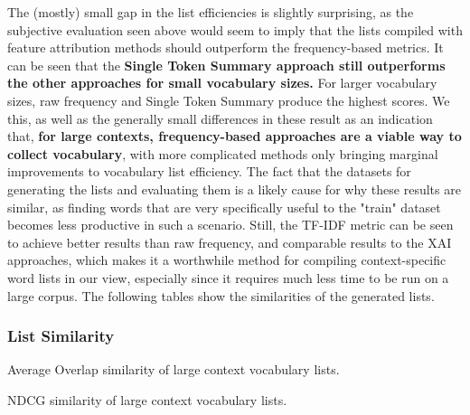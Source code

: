 The (mostly) small gap in the list efficiencies is slightly surprising, as the subjective evaluation seen above would seem to imply that the lists compiled with feature attribution methods should outperform the frequency-based metrics.
It can be seen that the \textbf{Single Token Summary approach still outperforms the other approaches for small vocabulary sizes.}
For larger vocabulary sizes, raw frequency and Single Token Summary produce the highest scores.
We this, as well as the generally small differences in these result as an indication that, \textbf{for large contexts, frequency-based approaches are a viable way to collect vocabulary}, with more complicated methods only bringing marginal improvements to vocabulary list efficiency.
The fact that the datasets for generating the lists and evaluating them is a likely cause for why these results are similar, as finding words that are very specifically useful to the "train" dataset becomes less productive in such a scenario.
Still, the TF-IDF metric can be seen to achieve better results than raw frequency, and comparable results to the XAI approaches, which makes it a worthwhile method for compiling context-specific word lists in our view, especially since it requires much less time to be run on a large corpus.
The following tables show the similarities of the generated lists.

\subsubsection{List Similarity}

\begin{table}[H]
	\centering
	\resizebox{\textwidth}{!}{%
		
	}
	\caption{Average Overlap similarity of large context vocabulary lists.}
	\label{tbl:similarity-results-big-average-overlap}
\end{table}

\begin{table}[H]
	\centering
	\resizebox{\textwidth}{!}{%
		
	}
	\caption{NDCG similarity of large context vocabulary lists.}
	\label{tbl:similarity-results-big-ndcg}
\end{table}





% 	


